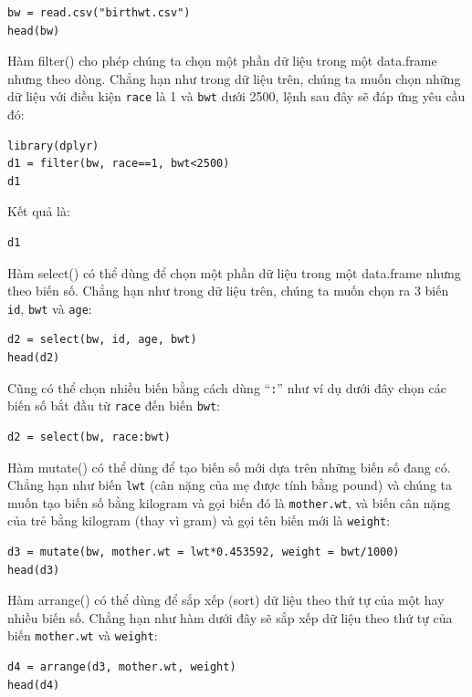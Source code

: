 \documentclass[
]{book}
\begin{document}
\begin{verbatim}
bw = read.csv("birthwt.csv")
head(bw)
\end{verbatim}

{Hàm filter()} cho phép chúng ta chọn một phần dữ liệu trong một data.frame nhưng theo dòng. Chẳng hạn như trong dữ liệu trên, chúng ta muốn chọn những dữ liệu với điều kiện \texttt{race} là 1 và \texttt{bwt} dưới 2500, lệnh sau đây sẽ đáp ứng yêu cầu đó:

\begin{verbatim}
library(dplyr)
d1 = filter(bw, race==1, bwt<2500)
d1
\end{verbatim}

Kết quả là:

\begin{verbatim}
d1
\end{verbatim}

{Hàm select()} có thể dùng để chọn một phần dữ liệu trong một data.frame nhưng theo biến số. Chẳng hạn như trong dữ liệu trên, chúng ta muốn chọn ra 3 biến \texttt{id}, \texttt{bwt} và \texttt{age}:

\begin{verbatim}
d2 = select(bw, id, age, bwt)
head(d2) 
\end{verbatim}

Cũng có thể chọn nhiều biến bằng cách dùng ``\texttt{:}'' như ví dụ dưới đây chọn các biến số bắt đầu từ \texttt{race} đến biến \texttt{bwt}:

\begin{verbatim}
d2 = select(bw, race:bwt)
\end{verbatim}

{Hàm mutate()} có thể dùng để tạo biến số mới dựa trên những biến số đang có. Chẳng hạn như biến \texttt{lwt} (cân nặng của mẹ được tính bằng pound) và chúng ta muốn tạo biến số bằng kilogram và gọi biến đó là \texttt{mother.wt}, và biến cân nặng của trẻ bằng kilogram (thay vì gram) và gọi tên biến mới là \texttt{weight}:

\begin{verbatim}
d3 = mutate(bw, mother.wt = lwt*0.453592, weight = bwt/1000) 
head(d3)
\end{verbatim}

{Hàm arrange()} có thể dùng để sắp xếp (sort) dữ liệu theo thứ tự của một hay nhiều biến số. Chẳng hạn như hàm dưới đây sẽ sắp xếp dữ liệu theo thứ tự của biến \texttt{mother.wt} và \texttt{weight}:

\begin{verbatim}
d4 = arrange(d3, mother.wt, weight)
head(d4) 
\end{verbatim}
\end{document}
